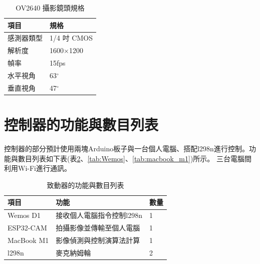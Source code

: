 \documentclass[12pt]{article}       %
\begin{document}
\begin{table}[H]
    \centering
    \caption{OV2640 攝影鏡頭規格\cite{taiwansensor_OV2640}}
    \vspace{6pt} %
    \label{tab:OV2640_Specs}
    \begin{tabular}{ll}
        \toprule
        \textbf{項目} & \textbf{規格} \\
        \midrule
        感測器類型 & 1/4 吋 CMOS \\
        解析度 & 1600$\times$1200 \\
        幀率  & 15fps \\
        水平視角 & 63$^\circ$ \\
        垂直視角  & 47$^\circ$ \\
        \bottomrule
    \end{tabular}
\end{table}


\section{\centering 控制器的功能與數目列表}

\hspace{2em}控制器的部分預計使用兩塊Arduino板子與一台個人電腦、搭配l298n進行控制。功能與數目列表如下表(表\ref{tab:c}、\ref{tab:Wemos}、\ref{tab:macbook_m1})所示。
三台電腦間利用Wi-Fi進行通訊。

\begin{table}[H]
    \centering
    \caption{致動器的功能與數目列表}
    \vspace{6pt} %
    \label{tab:c}
    \begin{tabular}{lll}
        \toprule
        \textbf{項目} & \textbf{功能} & \textbf{數量}\\
        \midrule
        Wemos D1  & 接收個人電腦指令控制l298n &1\\
        ESP32-CAM  & 拍攝影像並傳輸至個人電腦 &1\\
        MacBook M1  & 影像偵測與控制演算法計算 &1\\
        l298n  & 麥克納姆輪 &2\\
        \bottomrule
    \end{tabular}
\end{table}
\end{document}
